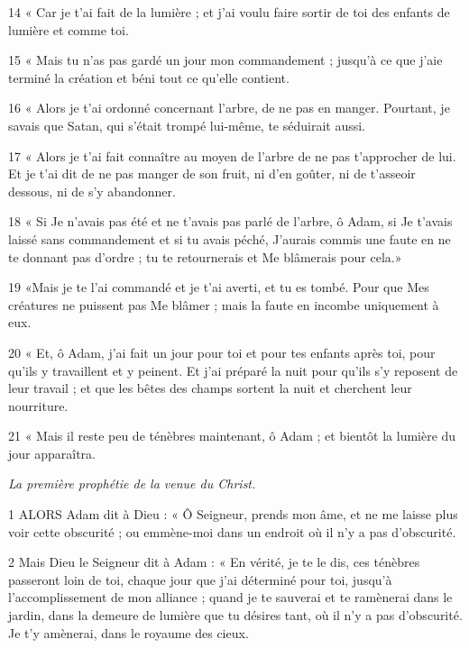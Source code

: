 \par 14 « Car je t'ai fait de la lumière ; et j’ai voulu faire sortir de toi des enfants de lumière et comme toi.

\par 15 « Mais tu n'as pas gardé un jour mon commandement ; jusqu'à ce que j'aie terminé la création et béni tout ce qu'elle contient.

\par 16 « Alors je t'ai ordonné concernant l'arbre, de ne pas en manger. Pourtant, je savais que Satan, qui s’était trompé lui-même, te séduirait aussi.

\par 17 « Alors je t'ai fait connaître au moyen de l'arbre de ne pas t'approcher de lui. Et je t'ai dit de ne pas manger de son fruit, ni d'en goûter, ni de t'asseoir dessous, ni de s'y abandonner.

\par 18 « Si Je n'avais pas été et ne t'avais pas parlé de l'arbre, ô Adam, si Je t'avais laissé sans commandement et si tu avais péché, J'aurais commis une faute en ne te donnant pas d'ordre ; tu te retournerais et Me blâmerais pour cela.»

\par 19 «Mais je te l'ai commandé et je t'ai averti, et tu es tombé. Pour que Mes créatures ne puissent pas Me blâmer ; mais la faute en incombe uniquement à eux.

\par 20 « Et, ô Adam, j'ai fait un jour pour toi et pour tes enfants après toi, pour qu'ils y travaillent et y peinent. Et j'ai préparé la nuit pour qu'ils s'y reposent de leur travail ; et que les bêtes des champs sortent la nuit et cherchent leur nourriture.

\par 21 « Mais il reste peu de ténèbres maintenant, ô Adam ; et bientôt la lumière du jour apparaîtra.


\par \textit{La première prophétie de la venue du Christ.}

\par 1 ALORS Adam dit à Dieu : « Ô Seigneur, prends mon âme, et ne me laisse plus voir cette obscurité ; ou emmène-moi dans un endroit où il n'y a pas d'obscurité.

\par 2 Mais Dieu le Seigneur dit à Adam : « En vérité, je te le dis, ces ténèbres passeront loin de toi, chaque jour que j'ai déterminé pour toi, jusqu'à l'accomplissement de mon alliance ; quand je te sauverai et te ramènerai dans le jardin, dans la demeure de lumière que tu désires tant, où il n'y a pas d'obscurité. Je t’y amènerai, dans le royaume des cieux.

